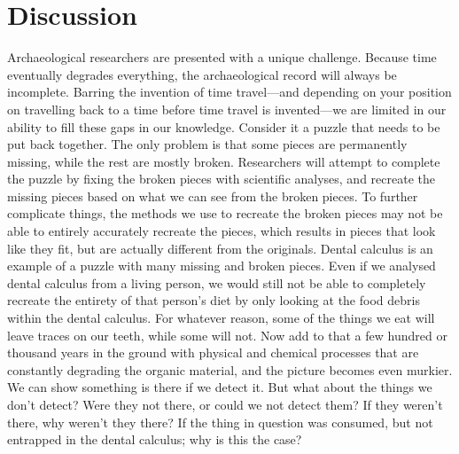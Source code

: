 \documentclass[
  letterpaper,
]{book}
\begin{document}
\hypertarget{chap-discussion}{%
\chapter{Discussion}\label{chap-discussion}}

Archaeological researchers are presented with a unique challenge.
Because time eventually degrades everything, the archaeological record
will always be incomplete. Barring the invention of time travel---and
depending on your position on travelling back to a time before time
travel is invented---we are limited in our ability to fill these gaps in
our knowledge. Consider it a puzzle that needs to be put back together.
The only problem is that some pieces are permanently missing, while the
rest are mostly broken. Researchers will attempt to complete the puzzle
by fixing the broken pieces with scientific analyses, and recreate the
missing pieces based on what we can see from the broken pieces. To
further complicate things, the methods we use to recreate the broken
pieces may not be able to entirely accurately recreate the pieces, which
results in pieces that look like they fit, but are actually different
from the originals. Dental calculus is an example of a puzzle with many
missing and broken pieces. Even if we analysed dental calculus from a
living person, we would still not be able to completely recreate the
entirety of that person's diet by only looking at the food debris within
the dental calculus. For whatever reason, some of the things we eat will
leave traces on our teeth, while some will not. Now add to that a few
hundred or thousand years in the ground with physical and chemical
processes that are constantly degrading the organic material, and the
picture becomes even murkier. We can show something is there if we
detect it. But what about the things we don't detect? Were they not
there, or could we not detect them? If they weren't there, why weren't
they there? If the thing in question was consumed, but not entrapped in
the dental calculus; why is this the case?
\end{document}

